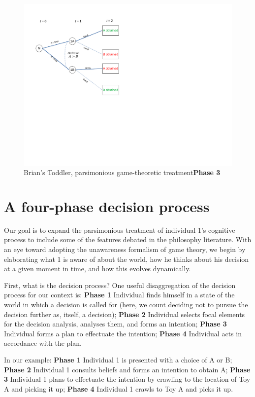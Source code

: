 \documentclass[
11pt,
titlepage,
reqno,
]{article}%
\theoremstyle{definition}
\begin{document}
\begin{figure}[h!]
	\centering
	\includegraphics*[page=1,trim = 0 3.5in 5in 0in,scale = .8]{Awareness_Diagrams_All}
	\caption{Brian's Toddler, parsimonious game-theoretic treatment\textbf{Phase 3} \label{Diag: p-01}}%
\end{figure}

\section*{A four-phase decision process}
Our goal is to expand the parsimonious treatment of individual 1's cognitive process to include some of the features debated in the philosophy literature. With an eye toward adopting the unawareness formalism of game theory, we begin by elaborating what 1 is aware of about the world, how he thinks about his decision at a given moment in time, and how this evolves dynamically. 

First, what is the decision process? One useful disaggregation of the decision process for our context is: \textbf{Phase 1} Individual finds himself in a state of the world in which a decision is called for (here, we count deciding not to pursue the decision further as, itself, a decision); \textbf{Phase 2} Individual selects focal elements for the decision analysis, analyses them, and forms an intention; \textbf{Phase 3} Individual forms a plan to effectuate the intention;  \textbf{Phase 4} Individual acts in accordance with the plan.

In our example: \textbf{Phase 1} Individual 1 is presented with a choice of A or B; \textbf{Phase 2} Individual 1 consults beliefs and forms an intention to obtain A; \textbf{Phase 3} Individual 1 plans to effectuate the intention by crawling to the location of Toy A and picking it up; \textbf{Phase 4} Individual 1 crawls to Toy A and picks it up. 
\end{document}
